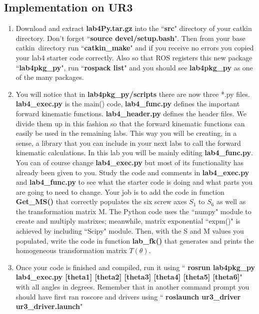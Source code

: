 \subsection{Implementation on UR3}
\begin{enumerate}
\item Download and extract \textbf{lab4Py.tar.gz} into the ``\textbf{src}" directory of your catkin directory.  Don't forget ``\textbf{source devel/setup.bash}".  Then from your base catkin\
directory run ``\textbf{catkin\_make}" and if you receive no errors you copied your lab4 starter code correctly.  Also so that ROS registers this new package ``\textbf{lab4pkg\_py}",
run ``\textbf{rospack list}" and you should see \textbf{lab4pkg\_py} as one of the many packages.
\item You will notice that in \textbf{lab4pkg\_py/scripts} there are now three *.py files.  \textbf{lab4\_exec.py} is the main() code, \textbf{lab4\_func.py} defines the important
forward kinematic functions. \textbf{lab4\_header.py} defines the header files.  We divide them up in this fashion so that the forward kinematic functions can easily be used in the remaining labs.  This way you will be creating, in a sense, a library that you can include in your next labs to call the forward kinematic calculations.  In this lab you will be mainly editing
\textbf{lab4\_func.py}.  You can of course change \textbf{lab4\_exec.py} but most of its functionality has already been given to you.  Study the code and comments in
\textbf{lab4\_exec.py} and \textbf{lab4\_func.py} to see what the starter code is doing and what parts you are going to need to change. Your job is to add the code in function \textbf{Get\_MS()} that
correctly populates the six screw axes $S_1$ to $S_6$ as well as the transformation matrix M.  The Python code uses the ``numpy" module to create and multiply matrixes; meanwhile, matrix exponential ``expm()" is achieved by including ``Scipy" module.  Then, with the S and M values you populated, write the code in function \textbf{lab\_fk()} that generates and prints the homogeneous transformation matrix $T(\theta)$.

\item Once your code is finished and compiled, run it using `` \textbf{rosrun lab4pkg\_py lab4\_exec.py [theta1] [theta2] [theta3] [theta4] [theta5] [theta6]}" with all angles in
degrees.  Remember that in another command prompt you should have first ran roscore and drivers using
`` \textbf{roslaunch ur3\_driver ur3\_driver.launch}"

\end{enumerate}
